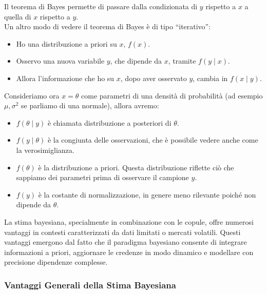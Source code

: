 \documentclass[%
	corpo=11pt,
    twoside,
    stile=classica,
    oldstyle,
    tipotesi=custom,
    greek,
    evenboxes,
]{toptesi}
\begin{document}
Il teorema di Bayes permette di passare dalla condizionata di \( y \) rispetto a \( x \) a quella di \( x \) rispetto a \( y \).\\

Un altro modo di vedere il teorema di Bayes è di tipo “iterativo”:
\begin{itemize}
	\item Ho una distribuzione a priori su \( x \), \( f(x) \).
	\item Osservo una nuova variabile \( y \), che dipende da \( x \), tramite \( f(y \mid x) \).
	\item Allora l’informazione che ho su \( x \), dopo aver osservato \( y \), cambia in \( f(x \mid y) \).
\end{itemize}

Consideriamo ora \( x = \theta \) come parametri di una densità di probabilità (ad esempio \( \mu, \sigma^2 \) se parliamo di una normale), allora avremo:

\begin{itemize}
	\item \( f(\theta \mid y) \) è chiamata distribuzione a posteriori di \( \theta \).
	\item \( f(y \mid \theta) \) è la congiunta delle osservazioni, che è possibile vedere anche come la verosimiglianza.
	\item \( f(\theta) \) è la distribuzione a priori. Questa distribuzione riflette ciò che sappiamo dei parametri prima di osservare il campione \( y \).
	\item \( f(y) \) è la costante di normalizzazione, in genere meno rilevante poiché non dipende da \( \theta \).
\end{itemize}

La stima bayesiana, specialmente in combinazione con le copule, offre numerosi vantaggi in contesti caratterizzati da dati limitati o mercati volatili. Questi vantaggi emergono dal fatto che il paradigma bayesiano consente di integrare informazioni a priori, aggiornare le credenze in modo dinamico e modellare con precisione dipendenze complesse.

\subsubsection{Vantaggi Generali della Stima Bayesiana}
\end{document}
